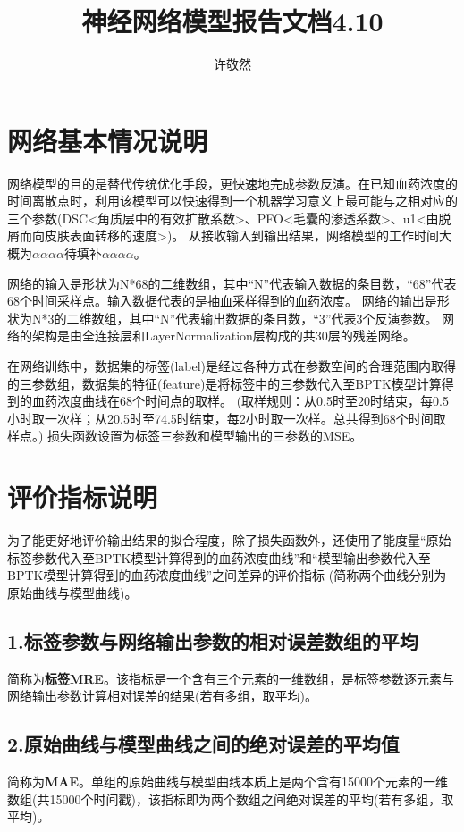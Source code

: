 \documentclass{article}
\date{}
\title{神经网络模型报告文档4.10}
\author{许敬然}
\begin{document}
\maketitle

\section*{网络基本情况说明}

网络模型的目的是替代传统优化手段，更快速地完成参数反演。在已知血药浓度的时间离散点时，利用该模型可以快速得到一个机器学习意义上最可能与之相对应的三个参数(DSC<角质层中的有效扩散系数>、PFO<毛囊的渗透系数>、u1<由脱屑而向皮肤表面转移的速度>)。
从接收输入到输出结果，网络模型的工作时间大概为$\alpha \alpha \alpha \alpha \mbox{待填补}\alpha \alpha \alpha \alpha $。

网络的输入是形状为N*68的二维数组，其中“N”代表输入数据的条目数，“68”代表68个时间采样点。输入数据代表的是抽血采样得到的血药浓度。
网络的输出是形状为N*3的二维数组，其中“N”代表输出数据的条目数，“3”代表3个反演参数。
网络的架构是由全连接层和LayerNormalization层构成的共30层的残差网络。

在网络训练中，数据集的标签(label)是经过各种方式在参数空间的合理范围内取得的三参数组，数据集的特征(feature)是将标签中的三参数代入至BPTK模型计算得到的血药浓度曲线在68个时间点的取样。
(取样规则：从0.5时至20时结束，每0.5小时取一次样；从20.5时至74.5时结束，每2小时取一次样。总共得到68个时间取样点。)
损失函数设置为标签三参数和模型输出的三参数的MSE。

\section*{评价指标说明}

为了能更好地评价输出结果的拟合程度，除了损失函数外，还使用了能度量“原始标签参数代入至BPTK模型计算得到的血药浓度曲线”和“模型输出参数代入至BPTK模型计算得到的血药浓度曲线”之间差异的评价指标
(简称两个曲线分别为原始曲线与模型曲线)。
\subsection*{1.标签参数与网络输出参数的相对误差数组的平均}
简称为\textbf{标签MRE}。该指标是一个含有三个元素的一维数组，是标签参数逐元素与网络输出参数计算相对误差的结果(若有多组，取平均)。
\subsection*{2.原始曲线与模型曲线之间的绝对误差的平均值}
简称为\textbf{MAE}。单组的原始曲线与模型曲线本质上是两个含有15000个元素的一维数组(共15000个时间戳)，该指标即为两个数组之间绝对误差的平均(若有多组，取平均)。
\end{document}
